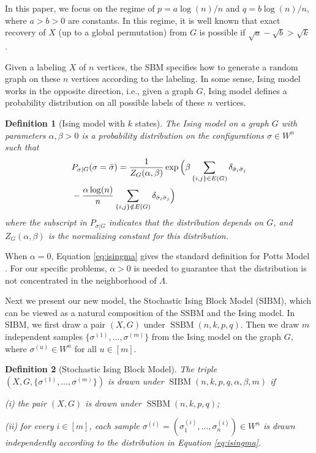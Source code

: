 \label{key}\documentclass[conference]{IEEEtran}
\newtheorem{definition}{Definition}%
\DeclareMathOperator{\SSBM}{SSBM}
\DeclareMathOperator{\SIBM}{SIBM}
\newcommand{\ide}[2]{ \delta_{#1 #2} }
\begin{document}
In this paper, we focus on the regime of $p=a\log(n)/n$ and $q=b\log(n)/n$, where $a>b> 0$ are constants. In this regime, it is well known that exact recovery of $X$ (up to a global permutation) from $G$ is possible if $\sqrt{a}-\sqrt{b} > \sqrt{k}$ \cite{abbe2015exact}.
 
Given a labeling $X$ of $n$ vertices, the SBM specifies how to generate a random graph on these $n$ vertices according to the labeling. In some sense, Ising model works in the opposite direction, i.e., given a graph $G$, Ising model defines a probability distribution on all possible labels of these $n$ vertices. 

 
\begin{definition}[Ising model with $k$ states]
The Ising model on a graph $G$ with parameters $\alpha,\beta>0$ is a probability distribution on the configurations $\sigma\in W^n$ such that
\begin{align} \label{eq:isingma}
&P_{\sigma|G}(\sigma=\bar{\sigma})=\frac{1}{Z_G(\alpha,\beta)}
\exp\Big(\beta \sum_{\{i,j\}\in E(G)} \ide{\bar{\sigma}_i}{\bar{\sigma}_j}\notag\\
&-\frac{\alpha\log(n)}{n} \sum_{\{i,j\}\notin E(G)} \ide{\bar{\sigma}_i}{\bar{\sigma}_j}
\Big)
\end{align}
where the subscript in $P_{\sigma|G}$ indicates that the distribution depends on $G$, and
$Z_G(\alpha,\beta)$ is the normalizing constant for this distribution.
\end{definition}

When $\alpha=0$, Equation \eqref{eq:isingma} gives the standard definition for Potts Model \cite{potts1952some}.
For our specific problems, $\alpha > 0$ is needed to guarantee that the distribution is not concentrated in the neighborhood of $\Lambda$.


Next we present our new model, the Stochastic Ising Block Model (SIBM), which can be viewed as a natural composition of the SSBM and the Ising model. In SIBM, we first draw a pair $(X,G)$ under $\SSBM(n,k,p,q)$.  Then we draw $m$ independent samples $\{\sigma^{(1)},\dots,\sigma^{(m)}\}$ from the Ising model on the graph $G$, where $\sigma^{(u)}\in W^n$ for all $u\in[m]$.

\begin{definition}[Stochastic Ising Block Model]
The triple $(X,G,\{\sigma^{(1)},\dots,\sigma^{(m)}\})$ is drawn under $\SIBM(n,k, p,q,\alpha,\beta,m)$ if

\noindent
(i) the pair $(X,G)$ is drawn under $\SSBM(n,k, p,q)$;

\noindent
(ii) for every $i\in[m]$, each sample $\sigma^{(i)}=(\sigma_1^{(i)},\dots,\sigma_n^{(i)}) \in W^n$ is drawn independently according to the distribution in Equation \eqref{eq:isingma}.
\end{definition}
\end{document}
